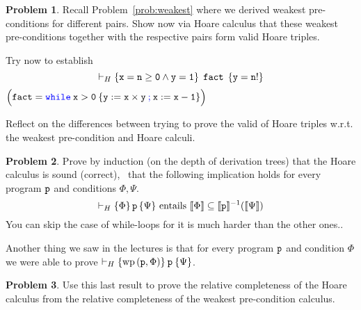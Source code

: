 \documentclass[a4paper, 11pt]{article}
\theoremstyle{definition}
\newtheorem{problem}{Problem}
\newcommand{\blue}[1]{\textcolor{blue}{#1}}
\begin{document}
\begin{problem}
        Recall Problem~\eqref{prob:weakest} where we derived weakest
        pre-conditions for different pairs. Show now via Hoare calculus that
        these weakest pre-conditions together with the respective pairs form
        valid Hoare triples.

        Try now to establish
        \[
                \vdash_H \{ \mathtt{x = n \geq 0 \wedge y = 1} \} \> \> \mathtt{fact} \> \>
                \{ \mathtt{y = n!} \}
        \]
        ${\small \Big ( \prog{fact} = \prog{\blue{while} \> x > 0 \> \{ y :=
        x \times y \> {\blue ;} \> x := x - 1 \} } \Big )}$

        Reflect on the differences between trying to prove the valid of Hoare triples
        w.r.t. the weakest pre-condition and Hoare calculi.
\end{problem}
\begin{problem}
        Prove by induction (on the depth of derivation trees) that the Hoare
        calculus is sound (correct), \ie\ that the following implication holds
        for every program $\mathtt{p}$ and conditions $\Phi, \Psi$.
        \[
                \vdash_H \{ \Phi \} \, \mathtt{p} \, \{ \Psi \}
                \text{ entails }
                \llbracket \Phi \rrbracket \subseteq \llbracket \mathtt{p} \rrbracket^{-1}(\llbracket \Psi \rrbracket)
        \]
        You can skip the case of while-loops for it is much harder than the other ones..
\end{problem}

Another thing we saw in the lectures is that for every program $\mathtt{p}$ and
condition $\Phi$ we were able to prove $\vdash_H \{ \mathrm{wp} \, (\mathtt{p},
\Phi) \} \> \mathtt{p} \> \{ \Psi \}$.

\begin{problem}
        Use this last result to prove the relative completeness of the Hoare calculus
        from the relative completeness of the weakest pre-condition calculus.
\end{problem}
\end{document}
